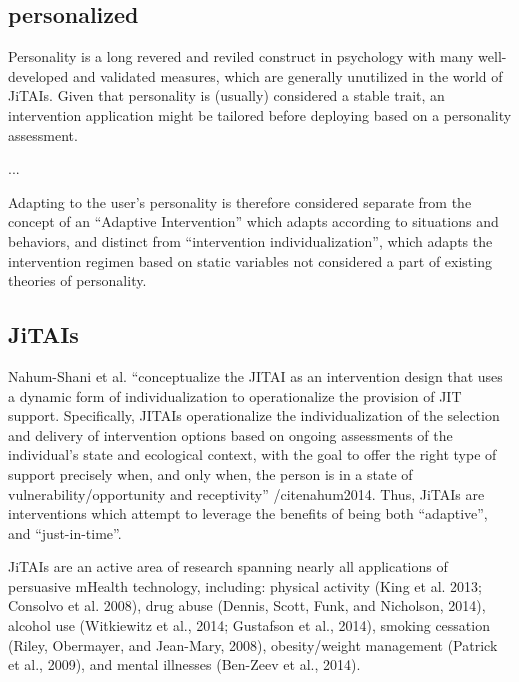 \documentclass[runningheads,a4paper]{llncs}
\begin{document}
\subsection{personalized}
Personality is a long revered and reviled construct in psychology with many well-developed and validated measures, which are generally unutilized in the world of JiTAIs. 
Given that personality is (usually) considered a stable trait, an intervention application might be tailored before deploying based on a personality assessment.

...

Adapting to the user’s personality is therefore considered separate from the concept of an “Adaptive Intervention” which adapts according to situations and behaviors, and distinct from “intervention individualization”, which adapts the intervention regimen based on static variables not considered a part of existing theories of personality.
\subsection{JiTAIs}
Nahum-Shani et al. “conceptualize the JITAI as an intervention design that uses a dynamic form of individualization to operationalize the provision of JIT support. Specifically, JITAIs operationalize the individualization of the selection and delivery of intervention options based on ongoing assessments of the individual’s state and ecological context, with the goal to offer the right type of support precisely when, and only when, the person is in a state of vulnerability/opportunity and receptivity” /cite{nahum2014}.
Thus, JiTAIs are interventions which attempt to leverage the benefits of being both “adaptive”, and “just-in-time”. 

JiTAIs are an active area of research spanning nearly all applications of persuasive mHealth technology, including:
physical activity (King et al. 2013; Consolvo et al. 2008), 
drug abuse (Dennis, Scott, Funk, and Nicholson, 2014), 
alcohol use (Witkiewitz et al., 2014; Gustafson et al., 2014), 
smoking cessation (Riley, Obermayer, and Jean-Mary, 2008), 
obesity/weight management (Patrick et al., 2009), 
and mental illnesses (Ben-Zeev et al., 2014).
\end{document}
